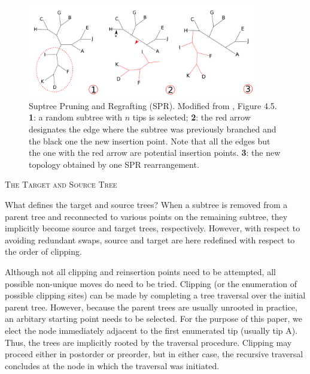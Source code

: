 \documentclass[12pt,letterpaper]{article}
\renewcommand{\section}[1]{%
\bigskip
\begin{center}
\begin{Large}
\normalfont\scshape #1
\medskip
\end{Large}
\end{center}}
\begin{document}
\begin{figure}[!htbp]
\centering
   \includegraphics[width=0.9\textwidth]{Figure/SPR.pdf}
\caption{Suptree Pruning and Regrafting (SPR). Modified from \cite{felsenstein2004inferring}, Figure 4.5. \textbf{1}: a random subtree with $n$ tips is selected; \textbf{2}: the red arrow designates the edge where the subtree was previously branched and the black one the new insertion point. Note that all the edges but the one with the red arrow are potential insertion points. \textbf{3}: the new topology obtained by one SPR rearrangement.}
\label{Figure_SPR}
\end{figure}

\section{The Target and Source Tree}
What defines the target and source trees? 
When a subtree is removed from a parent tree and reconnected to various points on the remaining subtree, they implicitly become source and target trees, respectively.
However, with respect to avoiding redundant swaps, source and target are here redefined with respect to the order of clipping. 

Although not all clipping and reinsertion points need to be attempted, all possible non-unique moves do need to be tried. 
Clipping (or the enumeration of possible clipping sites) can be made by completing a tree traversal over the initial parent tree.
However, because the parent trees are usually unrooted in practice, an arbitary starting point needs to be selected.
For the purpose of this paper, we elect the node immediately adjacent to the first enumerated tip (usually tip A).
Thus, the trees are implicitly rooted by the traversal procedure.
Clipping may proceed either in postorder or preorder, but in either case, the recursive traversal concludes at the node in which the traversal was initiated.
\end{document}
